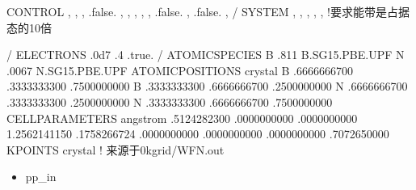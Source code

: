 \documentclass[a4paper,12pt,english]{sphinxmanual}
\begin{document}
\begin{sphinxVerbatim}[commandchars=\\\{\}]
 CONTROL
                          ,
                    ,
                   ,
                    .false. ,
                         ,
                         ,
                     ,
                         ,
                       .false. ,
                       .false. ,
 /
 SYSTEM
                         ,
                           ,
                          ,
                        ,
                         , !要求能带是占据态的10倍


 /
 ELECTRONS
              
              .0d\PYGZhy{}7
              
              .4
           
            
            .true.
/
ATOMIC\PYGZus{}SPECIES
B      .811 B.SG15.PBE.UPF
N      .0067 N.SG15.PBE.UPF
ATOMIC\PYGZus{}POSITIONS crystal
B            .6666666700       .3333333300       .7500000000
B            .3333333300       .6666666700       .2500000000
N            .6666666700       .3333333300       .2500000000
N            .3333333300       .6666666700       .7500000000
CELL\PYGZus{}PARAMETERS angstrom
      .5124282300       .0000000000       .0000000000
     \PYGZhy{}1.2562141150       .1758266724       .0000000000
      .0000000000       .0000000000       .7072650000
K\PYGZus{}POINTS crystal ! 来源于0\PYGZhy{}kgrid/WFN.out
\end{sphinxVerbatim}
\begin{itemize}
\item {} 
\sphinxAtStartPar
pp\_in

\end{itemize}
\end{document}
